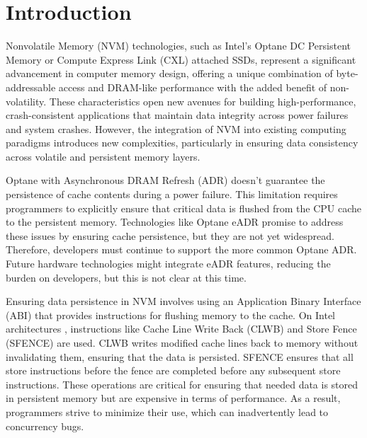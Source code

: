 \documentclass[nonacm,sigplan]{acmart}
\begin{document}
\section{Introduction}

Nonvolatile Memory (NVM) technologies, such as Intel's Optane DC Persistent Memory \cite{intel2019optane} or Compute Express Link (CXL) attached SSDs, represent a significant advancement in computer memory design, offering a unique combination of byte-addressable access and DRAM-like performance with the added benefit of non-volatility. These characteristics open new avenues for building high-performance, crash-consistent applications that maintain data integrity across power failures and system crashes. However, the integration of NVM into existing computing paradigms introduces new complexities, particularly in ensuring data consistency across volatile and persistent memory layers.

Optane with Asynchronous DRAM Refresh (ADR) doesn't guarantee the persistence of cache contents during a power failure. This limitation requires programmers to explicitly ensure that critical data is flushed from the CPU cache to the persistent memory. Technologies like Optane eADR \cite{intel2021optane_eadr} promise to address these issues by ensuring cache persistence, but they are not yet widespread. Therefore, developers must continue to support the more common Optane ADR. Future hardware technologies might integrate eADR features, reducing the burden on developers, but this is not clear at this time.

Ensuring data persistence in NVM involves using an Application Binary Interface (ABI) that provides instructions for flushing memory to the cache. On Intel architectures \cite{intel2020abi}, instructions like Cache Line Write Back (CLWB) and Store Fence (SFENCE) are used. CLWB writes modified cache lines back to memory without invalidating them, ensuring that the data is persisted. SFENCE ensures that all store instructions before the fence are completed before any subsequent store instructions. These operations are critical for ensuring that needed data is stored in persistent memory but are expensive in terms of performance. As a result, programmers strive to minimize their use, which can inadvertently lead to concurrency bugs.
\end{document}
